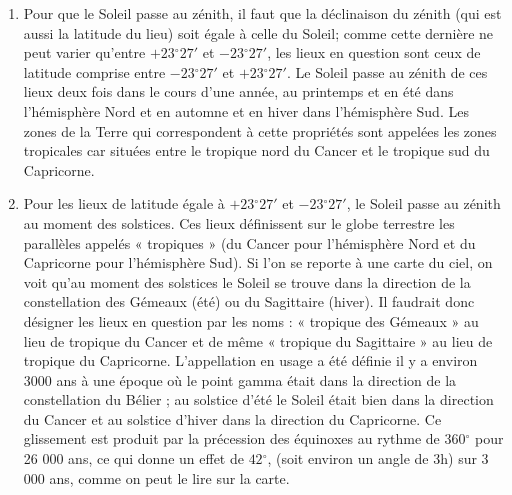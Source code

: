 \documentclass[a4paper,10pt]{report}
\renewcommand{\deg}{\ensuremath{^{\circ}}}
\begin{document}
\begin{Answer}
\begin{enumerate}
  \item Pour que le Soleil passe au zénith, il faut que la déclinaison
    du zénith (qui est aussi la latitude du lieu) soit égale à celle
    du Soleil; comme cette dernière ne peut varier qu'entre
    $+23\deg27'$ et $-23\deg27'$, les lieux en question sont ceux
    de latitude comprise entre $-23\deg27'$ et $+23\deg27'$. Le
    Soleil passe au zénith de ces lieux deux fois dans le cours d'une
    année, au printemps et en été dans l'hémisphère Nord et en automne
    et en hiver dans l'hémisphère Sud. Les zones de la Terre qui
    correspondent à cette propriétés sont appelées les zones
    tropicales car situées entre le tropique nord du Cancer et le
    tropique sud du Capricorne.

  \item Pour les lieux de latitude égale à $+23\deg27'$ et
    $-23\deg27'$, le Soleil passe au zénith au moment des
    solstices. Ces lieux définissent sur le globe terrestre les
    parallèles appelés « tropiques » (du Cancer pour l'hémisphère Nord
    et du Capricorne pour l'hémisphère Sud). Si l'on se reporte à une
    carte du ciel, on voit qu'au moment des solstices le Soleil se
    trouve dans la direction de la constellation des Gémeaux (été) ou
    du Sagittaire (hiver). Il faudrait donc désigner les lieux en
    question par les noms : « tropique des Gémeaux » au lieu de
    tropique du Cancer et de même « tropique du Sagittaire » au lieu
    de tropique du Capricorne. L'appellation en usage a été définie il
    y a environ 3000 ans à une époque où le point gamma était dans la
    direction de la constellation du Bélier ; au solstice d'été le
    Soleil était bien dans la direction du Cancer et au solstice
    d'hiver dans la direction du Capricorne. Ce glissement est produit
    par la précession des équinoxes au rythme de $360\deg$ pour 26
    000 ans, ce qui donne un effet de $42\deg$, (soit environ un
    angle de 3h) sur 3 000 ans, comme on peut le lire sur la carte.
\end{enumerate}
\end{Answer}
\end{document}
